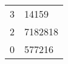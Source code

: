 \documentclass{article} %
\begin{document}
	
\begin{tabular}{r@{.}l}
	3 & 14159 \\
	2 & 7182818\\
	0 & 577216 \\
\end{tabular}
\end{document}
